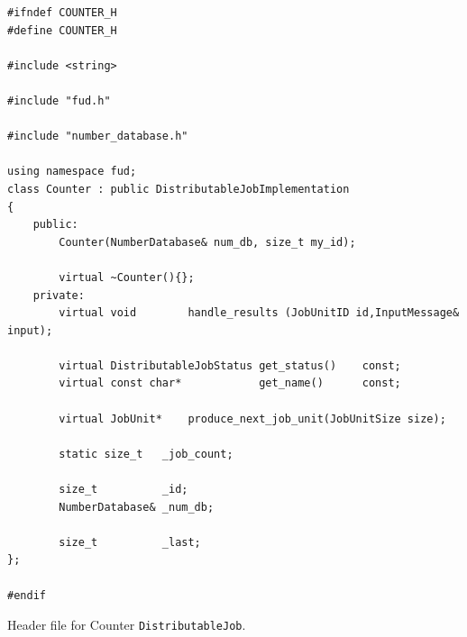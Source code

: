 \documentclass[a4paper,12pt,english]{report}
\renewcommand{\DJ}{\texttt{DistributableJob}}
\begin{document}
\begin{table}[!htb]
\lstset{language=C++}
\begin{tiny}
\begin{lstlisting}[frame=single]
#ifndef COUNTER_H
#define COUNTER_H

#include <string>

#include "fud.h"

#include "number_database.h"

using namespace fud;
class Counter : public DistributableJobImplementation
{
    public:
        Counter(NumberDatabase& num_db, size_t my_id);

        virtual ~Counter(){};
    private:
        virtual void        handle_results (JobUnitID id,InputMessage& input);

        virtual DistributableJobStatus get_status()    const;
        virtual const char*            get_name()      const;

        virtual JobUnit*    produce_next_job_unit(JobUnitSize size);

        static size_t   _job_count;

        size_t          _id;
        NumberDatabase& _num_db;

        size_t          _last;
};

#endif
\end{lstlisting}
\end{tiny}
\centering \caption{Header file for Counter \DJ.} \label{counterhdr}
\end{table}
\end{document}
